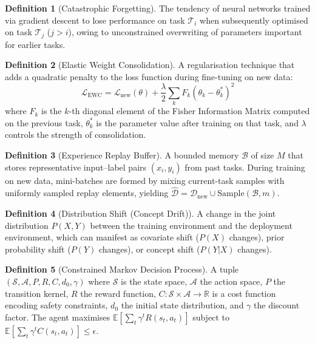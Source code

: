 \documentclass[12pt,a4paper]{article}
\theoremstyle{definition}
\newtheorem{definition}{Definition}[section]
\begin{document}
\begin{definition}[Catastrophic Forgetting]
The tendency of neural networks trained via gradient descent to lose performance on task $\mathcal{T}_i$ when subsequently optimised on task $\mathcal{T}_{j}$ ($j > i$), owing to unconstrained overwriting of parameters important for earlier tasks.
\end{definition}

\begin{definition}[Elastic Weight Consolidation]
A regularisation technique that adds a quadratic penalty to the loss function during fine-tuning on new data:
\begin{equation}
\mathcal{L}_{\text{EWC}} = \mathcal{L}_{\text{new}}(\theta) + \frac{\lambda}{2} \sum_{k} F_k \left(\theta_k - \theta_k^{*}\right)^2
\label{eq:ewc}
\end{equation}
where $F_k$ is the $k$-th diagonal element of the Fisher Information Matrix computed on the previous task, $\theta_k^{*}$ is the parameter value after training on that task, and $\lambda$ controls the strength of consolidation.
\end{definition}

\begin{definition}[Experience Replay Buffer]
A bounded memory $\mathcal{B}$ of size $M$ that stores representative input--label pairs $(x_i, y_i)$ from past tasks.
During training on new data, mini-batches are formed by mixing current-task samples with uniformly sampled replay elements, yielding $\hat{\mathcal{D}} = \mathcal{D}_{\text{new}} \cup \text{Sample}(\mathcal{B}, m)$.
\end{definition}

\begin{definition}[Distribution Shift (Concept Drift)]
A change in the joint distribution $P(X, Y)$ between the training environment and the deployment environment, which can manifest as covariate shift ($P(X)$ changes), prior probability shift ($P(Y)$ changes), or concept shift ($P(Y|X)$ changes).
\end{definition}

\begin{definition}[Constrained Markov Decision Process]
A tuple $(\mathcal{S}, \mathcal{A}, P, R, C, d_0, \gamma)$ where $\mathcal{S}$ is the state space, $\mathcal{A}$ the action space, $P$ the transition kernel, $R$ the reward function, $C: \mathcal{S} \times \mathcal{A} \to \mathbb{R}$ is a cost function encoding safety constraints, $d_0$ the initial state distribution, and $\gamma$ the discount factor.
The agent maximises $\mathbb{E}[\sum_t \gamma^t R(s_t, a_t)]$ subject to $\mathbb{E}[\sum_t \gamma^t C(s_t, a_t)] \leq \epsilon$.
\end{definition}
\end{document}
